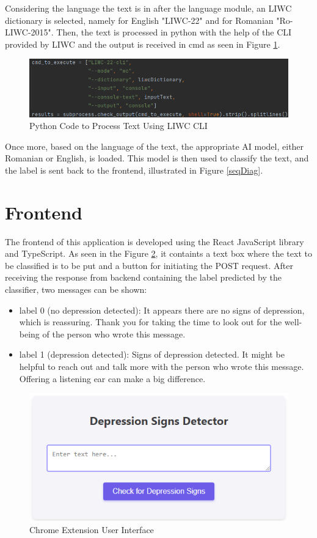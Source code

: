 Considering the language the text is in after the language module, an LIWC dictionary is selected, namely for English "LIWC-22" and for Romanian "Ro-LIWC-2015". Then, the text is processed in python with the help of the CLI provided by LIWC and the output is received in cmd as seen in Figure \ref{codeLiwcCli}.

\begin{figure}[htbp]
	\centering
		\includegraphics[scale=0.5]{LaTeX Bachelor Thesis Depression Signs Detection/figures/codeLiwcCLI.png}
	\caption{Python Code to Process Text Using LIWC CLI }
	\label{codeLiwcCli}
\end{figure}

Once more, based on the language of the text, the appropriate AI model, either Romanian or English, is loaded. This model is then used to classify the text, and the label is sent back to the frontend, illustrated in Figure \ref{seqDiag}.

\section{Frontend}

\quad The frontend of this application is developed using the React JavaScript library and TypeScript. As seen in the Figure \ref{interface}, it containts a text box where the text to be classified is to be put and a button for initiating the POST request. After receiving the response from backend containing the label predicted by the classifier, two messages can be shown:
\begin{itemize}
    \item label 0 (no depression detected): It appears there are no signs of depression, which is reassuring. Thank you for taking the time to look out for the well-being of the person who wrote this message.
    \item label 1 (depression detected):  Signs of depression detected. It might be helpful to reach out and talk more with the person who wrote this message. Offering a listening ear can make a big difference.
\end{itemize}

\begin{figure}[htbp]
	\centering
		\includegraphics[scale=0.5]{LaTeX Bachelor Thesis Depression Signs Detection/figures/interface.png}
	\caption{Chrome Extension User Interface}
	\label{interface}
\end{figure}








